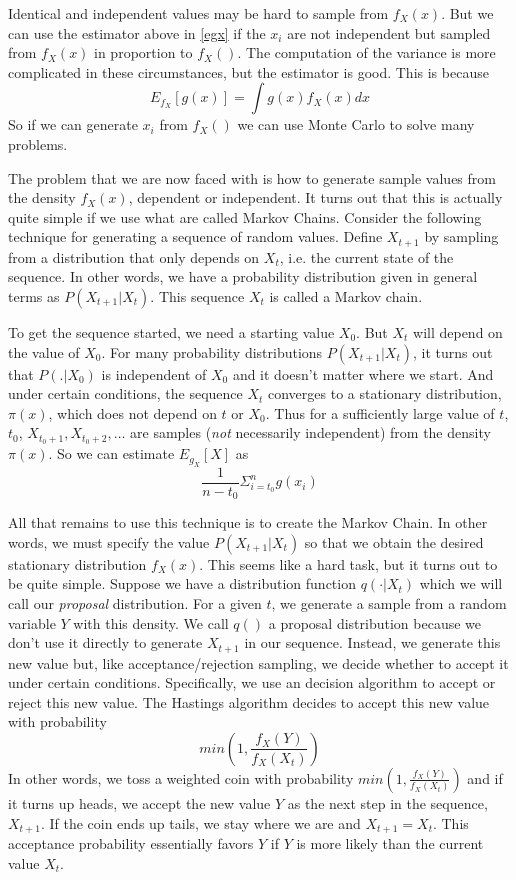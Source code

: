 \documentclass{article}
\begin{document}
Identical and independent values may be hard to sample from $f_X(x)$.
But we can use the estimator above in \ref{egx} if the $x_i$ are not
independent but sampled from $f_X(x)$ in proportion to $f_X()$.  The
computation of the variance is more complicated in these
circumstances, but the estimator is good.  This is because
\begin{equation}
  E_{f_X}[g(x)] = \int g(x) f_X(x) dx
\end{equation}
So if we can generate $x_i$ from $f_X()$ we can use Monte Carlo to
solve many problems.

The problem that we are now faced with is how to generate sample
values from the density $f_X(x)$, dependent or independent.  It turns
out that this is actually quite simple if we use what are called
Markov Chains.  Consider the following technique for generating a
sequence of random values.  Define $X_{t+1}$ by sampling from a
distribution that only depends on $X_t$, i.e. the current state of the
sequence.  In other words, we have a probability distribution given in
general terms as $P(X_{t+1} \vert X_t)$.  This sequence ${X_t}$ is
called a Markov chain.

To get the sequence started, we need a starting value $X_0$.  But
$X_{t}$ will depend on the value of $X_0$.  For many probability
distributions $P(X_{t+1} | X_t)$, it turns out that $P(. | X_0)$ is
independent of $X_0$ and it doesn't matter where we start.  And under
certain conditions, the sequence ${X_t}$ converges to a stationary
distribution, $\pi(x)$, which does not depend on $t$ or $X_0$.  Thus
for a sufficiently large value of $t$, $t_0$, $X_{t_{0} + 1}, X_{t_{0}
  + 2}, \ldots$ are samples (\textit{not} necessarily independent)
from the density $\pi(x)$.
So we can estimate $E_{g_X}[X]$ as 
\begin{equation}
  \frac{1}{n - t_0}\Sigma_{i = t_0}^n g(x_i)
\end{equation}


All that remains to use this technique is to create the Markov Chain.
In other words, we must specify the value $P(X_{t+1} \vert X_t)$ so
that we obtain the desired stationary distribution $f_X(x)$.  This
seems like a hard task, but it turns out to be quite simple.  Suppose
we have a distribution function $q(\cdot \vert X_t)$ which we will
call our \textit{proposal} distribution.  For a given $t$, we generate
a sample from a random variable $Y$ with this density.  We call $q()$
a proposal distribution because we don't use it directly to generate
$X_{t+1}$ in our sequence. Instead, we generate this new value but,
like acceptance/rejection sampling, we decide whether to accept it
under certain conditions.  Specifically, we use an decision algorithm
to accept or reject this new value.
The Hastings algorithm decides to accept this new value
with probability
$$
 min(1, \frac{f_X(Y)}{f_X(X_t)})
 $$ In other words, we toss a weighted coin with probability $ min(1,
 \frac{f_X(Y)}{f_X(X_t)})$ and if it turns up heads, we accept the new
 value $Y$ as the next step in the sequence, $X_{t+1}$.  If the coin
 ends up tails, we stay where we are and $X_{t+1} = X_t$.  This
 acceptance probability essentially favors $Y$ if $Y$ is more likely
 than the current value $X_{t}$.
\end{document}
